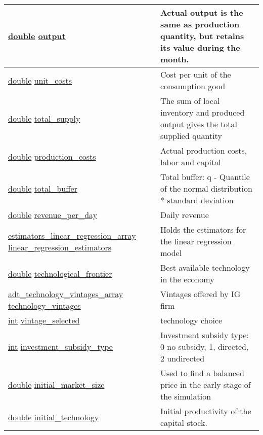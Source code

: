 \documentclass[a4paper,11pt]{article}
\begin{document}
\begin{longtable}[H!]{ll}
\midrule
\parbox{5cm}{\url{double} \url{output}}  & \parbox{10cm}{Actual output is the same as production quantity, but retains its value during the month.} \\
\midrule
\parbox{5cm}{\url{double} \url{unit_costs}}  & \parbox{10cm}{Cost per unit of the consumption good} \\
\midrule
\parbox{5cm}{\url{double} \url{total_supply}}  & \parbox{10cm}{The sum of local inventory and produced output gives the total supplied quantity} \\
\midrule
\parbox{5cm}{\url{double} \url{production_costs}}  & \parbox{10cm}{Actual production costs, labor and capital} \\
\midrule
\parbox{5cm}{\url{double} \url{total_buffer}}  & \parbox{10cm}{Total buffer: q - Quantile of the normal distribution * standard deviation} \\
\midrule
\parbox{5cm}{\url{double} \url{revenue_per_day}}  & \parbox{10cm}{Daily revenue} \\
\midrule
\parbox{5cm}{\url{estimators_linear_regression_array} \url{linear_regression_estimators}}  & \parbox{10cm}{Holds the estimators for the linear regression model} \\
\midrule
\parbox{5cm}{\url{double} \url{technological_frontier}}  & \parbox{10cm}{Best available technology in the economy} \\
\midrule
\parbox{5cm}{\url{adt_technology_vintages_array} \url{technology_vintages}}  & \parbox{10cm}{Vintages offered by IG firm} \\
\midrule
\parbox{5cm}{\url{int} \url{vintage_selected}}  & \parbox{10cm}{technology choice} \\
\midrule
\parbox{5cm}{\url{int} \url{investment_subsidy_type}}  & \parbox{10cm}{Investment subsidy type: 0 no subsidy, 1, directed, 2 undirected} \\
\midrule
\parbox{5cm}{\url{double} \url{initial_market_size}}  & \parbox{10cm}{Used to find a balanced price in the early stage of the simulation} \\
\midrule
\parbox{5cm}{\url{double} \url{initial_technology}}  & \parbox{10cm}{Initial productivity of the capital stock.} \\

\end{longtable}
\end{document}
